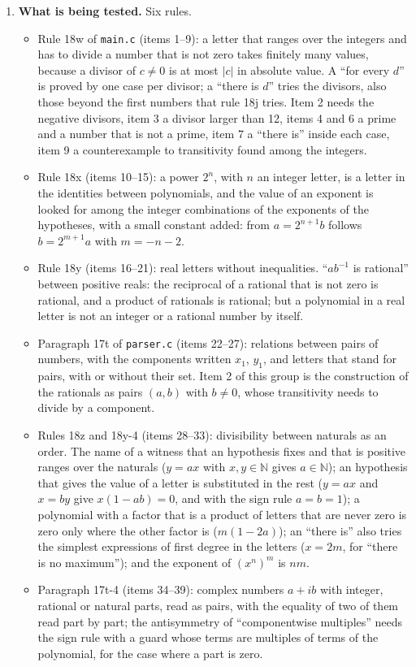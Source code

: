 \documentclass[11pt,a4paper]{article}
\begin{document}
\begin{enumerate}
\item \textbf{What is being tested.} Six rules.
\begin{itemize}
\item Rule 18w of \texttt{main.c} (items 1--9): a letter that ranges over the integers and has to divide a number that is not zero takes finitely many values, because a divisor of $c \neq 0$ is at most $|c|$ in absolute value. A ``for every $d$'' is proved by one case per divisor; a ``there is $d$'' tries the divisors, also those beyond the first numbers that rule 18j tries. Item 2 needs the negative divisors, item 3 a divisor larger than 12, items 4 and 6 a prime and a number that is not a prime, item 7 a ``there is'' inside each case, item 9 a counterexample to transitivity found among the integers.
\item Rule 18x (items 10--15): a power $2^{n}$, with $n$ an integer letter, is a letter in the identities between polynomials, and the value of an exponent is looked for among the integer combinations of the exponents of the hypotheses, with a small constant added: from $a = 2^{n + 1} b$ follows $b = 2^{m + 1} a$ with $m = -n - 2$.
\item Rule 18y (items 16--21): real letters without inequalities. ``$a b^{-1}$ is rational'' between positive reals: the reciprocal of a rational that is not zero is rational, and a product of rationals is rational; but a polynomial in a real letter is not an integer or a rational number by itself.
\item Paragraph 17t of \texttt{parser.c} (items 22--27): relations between pairs of numbers, with the components written $x_{1}$, $y_{1}$, and letters that stand for pairs, with or without their set. Item 2 of this group is the construction of the rationals as pairs $(a, b)$ with $b \neq 0$, whose transitivity needs to divide by a component.
\item Rules 18z and 18y-4 (items 28--33): divisibility between naturals as an order. The name of a witness that an hypothesis fixes and that is positive ranges over the naturals ($y = a x$ with $x, y \in \mathbb{N}$ gives $a \in \mathbb{N}$); an hypothesis that gives the value of a letter is substituted in the rest ($y = a x$ and $x = b y$ give $x (1 - a b) = 0$, and with the sign rule $a = b = 1$); a polynomial with a factor that is a product of letters that are never zero is zero only where the other factor is ($m (1 - 2a)$); an ``there is'' also tries the simplest expressions of first degree in the letters ($x = 2m$, for ``there is no maximum''); and the exponent of $(x^{n})^{m}$ is $n m$.
\item Paragraph 17t-4 (items 34--39): complex numbers $a + ib$ with integer, rational or natural parts, read as pairs, with the equality of two of them read part by part; the antisymmetry of ``componentwise multiples'' needs the sign rule with a guard whose terms are multiples of terms of the polynomial, for the case where a part is zero.
\end{itemize}


\end{enumerate}
\end{document}
